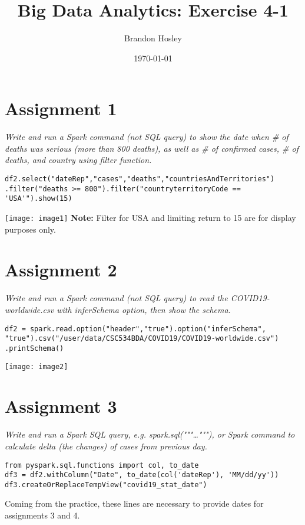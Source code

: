 \documentclass[]{article}
\title{Big Data Analytics: Exercise 4-1}
\author{Brandon Hosley}
\date{\today}
\begin{document}
\maketitle

\section*{Assignment 1}
\emph{ Write and run a Spark command (not SQL query) to show the date when \# of deaths was serious (more than 800 deaths), as well as \# of confirmed cases, \# of deaths, and country using filter function. }

\begin{verbatim}
df2.select("dateRep","cases","deaths","countriesAndTerritories") .filter("deaths >= 800").filter("countryterritoryCode == 'USA'").show(15)
\end{verbatim}
\texttt{[image: image1]} %
\textbf{Note:} Filter for USA and limiting return to 15 are for display purposes only.

\clearpage

\section*{Assignment 2}
\emph{ Write and run a Spark command (not SQL query) to read the COVID19-worldwide.csv with inferSchema option, then show the schema.
}

\begin{verbatim}
df2 = spark.read.option("header","true").option("inferSchema", "true").csv("/user/data/CSC534BDA/COVID19/COVID19-worldwide.csv") .printSchema()
\end{verbatim}
\texttt{[image: image2]} %

\clearpage

\section*{Assignment 3}
\emph{ Write and run a Spark SQL query, e.g. spark.sql("""\ldots"""), or Spark command to calculate delta (the changes) of cases from previous day. }

\begin{verbatim}
from pyspark.sql.functions import col, to_date
df3 = df2.withColumn("Date", to_date(col('dateRep'), 'MM/dd/yy'))
df3.createOrReplaceTempView("covid19_stat_date")
\end{verbatim}
Coming from the practice, these lines are necessary to provide dates for assignments 3 and 4.
\end{document}
